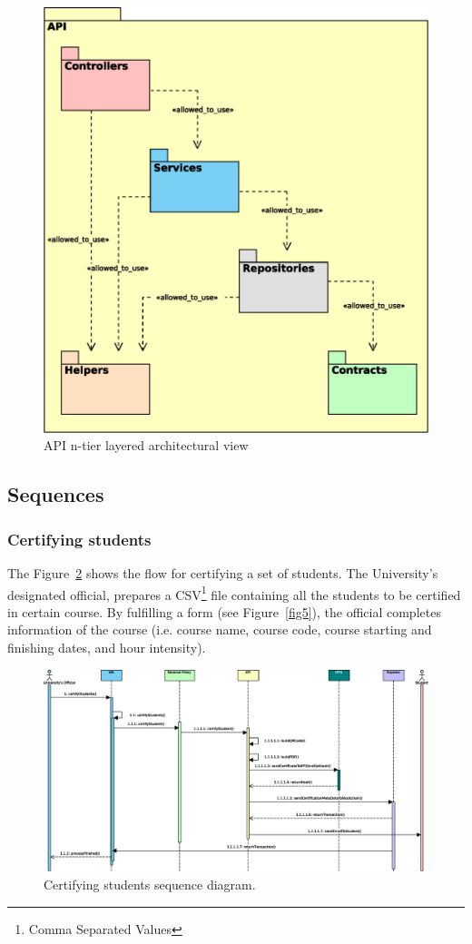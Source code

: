 \documentclass[runningheads]{llncs}
\begin{document}
\begin{figure}
\includegraphics[width=\textwidth]{03-API-Layer.eps}
\caption{API n-tier layered architectural view}
\label{fig3}
\end{figure}

\subsection{Sequences}
\subsubsection{Certifying students}
The Figure~\ref{fig4} shows the flow for certifying a set of students. The University's designated  official, prepares a CSV\footnote{Comma Separated Values} file containing all the students to be certified in certain course. By fulfilling a form (see Figure~\ref{fig5}), the official completes information of the course (i.e. course name, course code, course starting and finishing dates, and hour intensity).

\begin{figure}
\includegraphics[width=\textwidth]{04-WA-requests-to-API.eps}
\caption{Certifying students sequence diagram.}
\label{fig4}
\end{figure}
\end{document}
